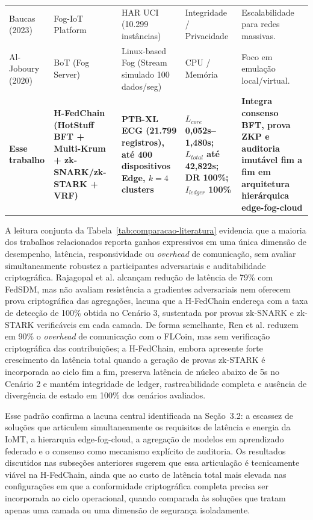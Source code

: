 \documentclass[12pt]{article}
\begin{document}
\begin{table}[htbp]
\begin{tabular}{p{2.1cm}p{2.6cm}p{2.6cm}p{2.3cm}p{3.2cm}}
Baucas (2023) & Fog-IoT Platform & HAR UCI (10.299 instâncias) & Integridade / Privacidade & Escalabilidade para redes massivas. \\
Al-Joboury (2020) & BoT (Fog Server) & Linux-based Fog (Stream simulado 100 dados/seg) & CPU / Memória & Foco em emulação local/virtual. \\
\hline
\textbf{Esse trabalho} & \textbf{H-FedChain (HotStuff BFT + Multi-Krum + zk-SNARK/zk-STARK + VRF)} & \textbf{PTB-XL ECG (21.799 registros), até 400 dispositivos Edge, $k=4$ clusters} & \textbf{$L_{core}$ 0,052s--1,480s; $L_{total}$ até 42,822s; DR 100\%; $I_{ledger}$ 100\%} & \textbf{Integra consenso BFT, prova ZKP e auditoria imutável fim a fim em arquitetura hierárquica edge-fog-cloud} \\
\hline
\end{tabular}
\end{table}

A leitura conjunta da Tabela~\ref{tab:comparacao-literatura} evidencia que a maioria dos trabalhos relacionados reporta ganhos expressivos em uma única dimensão de desempenho, latência, responsividade ou \textit{overhead} de comunicação, sem avaliar simultaneamente robustez a participantes adversariais e auditabilidade criptográfica. Rajagopal et al. alcançam redução de latência de 79\% com FedSDM, mas não avaliam resistência a gradientes adversariais nem oferecem prova criptográfica das agregações, lacuna que a H-FedChain endereça com a taxa de detecção de 100\% obtida no Cenário 3, sustentada por provas zk-SNARK e zk-STARK verificáveis em cada camada. De forma semelhante, Ren et al. reduzem em 90\% o \textit{overhead} de comunicação com o FLCoin, mas sem verificação criptográfica das contribuições; a H-FedChain, embora apresente forte crescimento da latência total quando a geração de provas zk-STARK é incorporada ao ciclo fim a fim, preserva latência de núcleo abaixo de 5s no Cenário 2 e mantém integridade de ledger, rastreabilidade completa e ausência de divergência de estado em 100\% dos cenários avaliados.

Esse padrão confirma a lacuna central identificada na Seção~3.2: a escassez de soluções que articulem simultaneamente os requisitos de latência e energia da IoMT, a hierarquia edge-fog-cloud, a agregação de modelos em aprendizado federado e o consenso como mecanismo explícito de auditoria. Os resultados discutidos nas subseções anteriores sugerem que essa articulação é tecnicamente viável na H-FedChain, ainda que ao custo de latência total mais elevada nas configurações em que a conformidade criptográfica completa precisa ser incorporada ao ciclo operacional, quando comparada às soluções que tratam apenas uma camada ou uma dimensão de segurança isoladamente.
\end{document}
